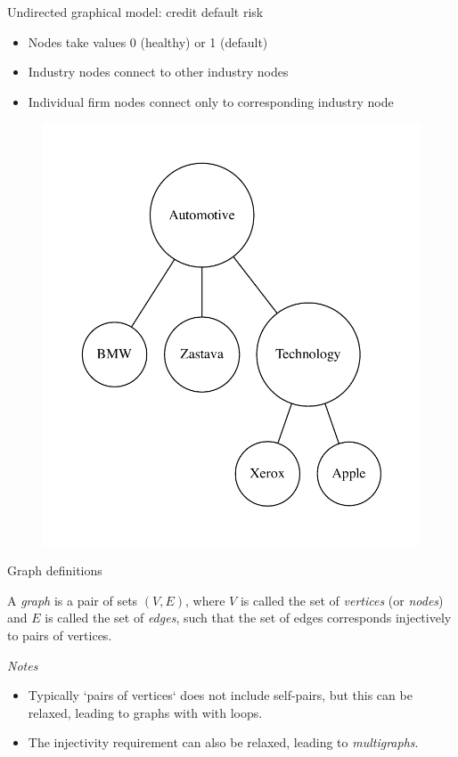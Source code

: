 \begin{frame}{Undirected graphical model: credit default risk \cite{filiz2012graphical}}
  \begin{itemize}
    \item Nodes take values 0 (healthy) or 1 (default)
    \item Industry nodes connect to other industry nodes
    \item Individual firm nodes connect only to corresponding industry node
  \end{itemize}
  \begin{figure}[ht]
    \centering
    \includegraphics[height=0.6\textheight]{graphics/credit_default}
  \end{figure}
\end{frame}


\begin{frame}{Graph definitions}
  \begin{definition}
    A \emph{graph} is a pair of sets $(V, E)$, where $V$ is called the set of \emph{vertices} (or \emph{nodes}) and $E$ is called the set of \emph{edges}, such that the set of edges corresponds injectively to pairs of vertices. \newline
  \end{definition}

  \emph{Notes}
  \begin{itemize}
    \item Typically `pairs of vertices` does not include self-pairs, but this can be relaxed, leading to graphs with with loops.
    \item The injectivity requirement can also be relaxed, leading to \emph{multigraphs}.
  \end{itemize}
\end{frame}


